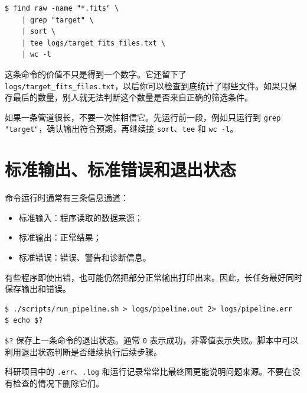 \begin{examplebox}[从问题到管道]
\begin{lstlisting}[style=terminal]
$ find raw -name "*.fits" \
    | grep "target" \
    | sort \
    | tee logs/target_fits_files.txt \
    | wc -l
\end{lstlisting}
\end{examplebox}

这条命令的价值不只是得到一个数字。它还留下了 \texttt{logs/target\_fits\_files.txt}，以后你可以检查到底统计了哪些文件。如果只保存最后的数量，别人就无法判断这个数量是否来自正确的筛选条件。

\begin{warnbox}[管道中的每一步都应该能单独解释]
如果一条管道很长，不要一次性相信它。先运行前一段，例如只运行到 \texttt{grep "target"}，确认输出符合预期，再继续接 \texttt{sort}、\texttt{tee} 和 \texttt{wc -l}。
\end{warnbox}

\section{标准输出、标准错误和退出状态}

命令运行时通常有三条信息通道：

\begin{itemize}
    \item 标准输入：程序读取的数据来源；
    \item 标准输出：正常结果；
    \item 标准错误：错误、警告和诊断信息。
\end{itemize}

有些程序即使出错，也可能仍然把部分正常输出打印出来。因此，长任务最好同时保存输出和错误。

\begin{examplebox}[保存输出和错误]
\begin{lstlisting}[style=terminal]
$ ./scripts/run_pipeline.sh > logs/pipeline.out 2> logs/pipeline.err
$ echo $?
\end{lstlisting}
\end{examplebox}

\texttt{\$?} 保存上一条命令的退出状态。通常 \texttt{0} 表示成功，非零值表示失败。脚本中可以利用退出状态判断是否继续执行后续步骤。

\begin{protip}[错误日志不是垃圾]
科研项目中的 \texttt{.err}、\texttt{.log} 和运行记录常常比最终图更能说明问题来源。不要在没有检查的情况下删除它们。
\end{protip}

